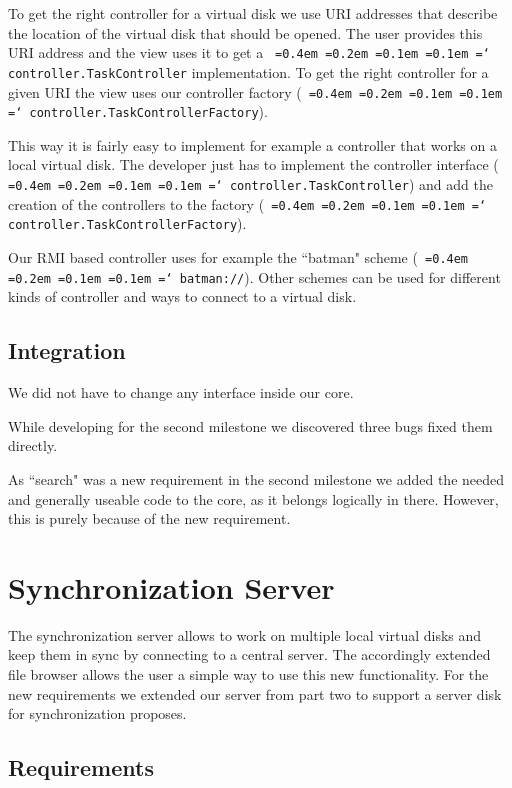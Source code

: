 \documentclass[a4paper,12pt]{article}
\newcommand*\justify{%
  \fontdimen2\font=0.4em%
  \fontdimen3\font=0.2em%
  \fontdimen4\font=0.1em%
  \fontdimen7\font=0.1em%
  \hyphenchar\font=`\-%
}
\newcommand{\mono}[1]{\texttt{\justify #1}}
\begin{document}
To get the right controller for a virtual disk we use URI addresses that describe the location of the virtual disk that should be opened. The user provides this URI address and the view uses it to get a \mono{controller.TaskController} implementation. To get the right controller for a given URI the view uses our controller factory (\mono{controller.TaskControllerFactory}).

This way it is fairly easy to implement for example a controller that works on a local virtual disk. The developer just has to implement the controller interface (\mono{controller.TaskController}) and add the creation of the controllers to the factory (\mono{controller.TaskControllerFactory}).

Our RMI based controller uses for example the ``batman" scheme (\mono{batman://}). Other schemes can be used for different kinds of controller and ways to connect to a virtual disk.

\subsection{Integration}
We did not have to change any interface inside our core.

While developing for the second milestone we discovered three bugs fixed them directly.

As ``search" was a new requirement in the second milestone we added the needed and generally useable code to the core, as it belongs logically in there. However, this is purely because of the new requirement.




\section{Synchronization Server}

The synchronization server allows to work on multiple local virtual disks and keep them in sync by connecting to a central server. The accordingly extended file browser allows the user a simple way to use this new functionality. For the new requirements we extended our server from part two to support a server disk for synchronization proposes.

\subsection{Requirements}
\end{document}
